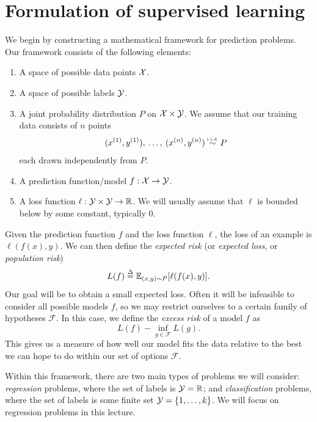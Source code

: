 \documentclass[]{subook}
\begin{document}
\section{Formulation of supervised learning}
We begin by constructing a mathematical framework for prediction problems. Our framework consists of the following elements:
\begin{enumerate}
	\item A space of possible data points $\mathcal{X}$.
	\item A space of possible labels $\mathcal{Y}$.
	\item A joint probability distribution $P$ on $\mathcal{X}\times \mathcal{Y}$. We assume that our training data consists of $n$ points $$(x^{(1)}, y^{(1)}), \: \ldots, \: (x^{(n)}, y^{(n)}) \: \iid \: P$$ each drawn independently from $P$.
	\item A prediction function/model $f: \mathcal{X}\rightarrow \mathcal{Y}$.
	\item A loss function $\ell: \mathcal{Y}\times \mathcal{Y}\rightarrow \mathbb{R}$. We will usually assume that $\ell$ is bounded below by some constant, typically $0$.
\end{enumerate}
Given the prediction function $f$ and the loss function $\ell$, the loss of an example is $\ell(f(x),y)$. We can then define the \textit{expected risk} (or \textit{expected loss}, or \textit{population risk})
$$L(f) \defn \E_{(x,y)\sim P} [\ell(f(x),y)].$$ Our goal will be to obtain a small expected loss. Often it will be infeasible to consider all possible models $f$, so we may restrict ourselves to a certain family of hypotheses $\mathcal{F}$. In this case, we define the \textit{excess risk} of a model $f$ as $$L(f) - \inf_{g\in\mathcal{F}} L(g).$$ This gives us a measure of how well our model fits the data relative to the best we can hope to do within our set of options $\mathcal{F}$.

Within this framework, there are two main types of problems we will consider: \textit{regression} problems, where the set of labels is $\mathcal{Y}=\mathbb{R}$; and \textit{classification} problems, where the set of labels is some finite set $\mathcal{Y}=\{1,\ldots,k\}$. We will focus on regression problems in this lecture.
\end{document}
